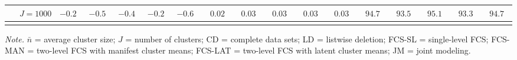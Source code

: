 \begin{sidewaystable}
\begin{threeparttable}
\begin{tabular}{llccccccccccccccc}
 & \nopagebreak $\;J=1000$  & ${-}0.2\phantom{0}$ & ${-}0.5\phantom{0}$ & ${-}0.4\phantom{0}$ & ${-}0.2\phantom{0}$ & ${-}0.6\phantom{0}$ & $\phantom{0}0.02\phantom{0}$ & $\phantom{0}0.03\phantom{0}$ & $\phantom{0}0.03\phantom{0}$ & $\phantom{0}0.03\phantom{0}$ & $\phantom{0}0.03\phantom{0}$ & $\phantom{0}94.7\phantom{0}$ & $\phantom{0}93.5\phantom{0}$ & $\phantom{0}95.1\phantom{0}$ & $\phantom{0}93.3\phantom{0}$ & $\phantom{0}94.7\phantom{0}$ \\
[0.5ex]\hline\\[-1.6ex] 
\end{tabular}
\begin{tablenotes}{\footnotesize \textit{Note.} $\bar{n}$ = average cluster size; $J$ = number of clusters; CD = complete data sets; LD = listwise deletion; FCS-SL = single-level FCS; FCS-MAN = two-level FCS with manifest cluster means; FCS-LAT = two-level FCS with latent cluster means; JM = joint modeling.}\end{tablenotes}
\end{threeparttable}
\end{sidewaystable}
